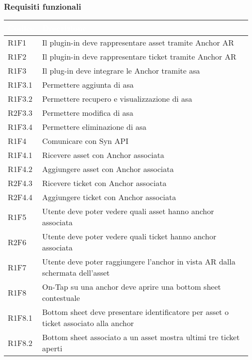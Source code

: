 \subsubsection{Requisiti funzionali}
{
    \setlength{\freewidth}{\dimexpr\textwidth-10\tabcolsep}
    \renewcommand{\arraystretch}{1.5}
    \centering
    \setlength{\aboverulesep}{0pt}
    \setlength{\belowrulesep}{0pt}
    \begin{longtable}{C{.15\freewidth} | C{1\freewidth}}
       \toprule
    \textcolor{white}{\textbf{Codice}}&
    \textcolor{white}{\textbf{Descrizione}}\\
    \toprule
    \endhead

    R1F1 & Il plugin-in deve rappresentare asset tramite Anchor AR\\
    R1F2 & Il plugin-in deve rappresentare ticket tramite Anchor AR\\
    R1F3 & Il plug-in deve integrare le Anchor tramite asa\\
    R1F3.1 & Permettere aggiunta di asa\\%
    R1F3.2 & Permettere recupero e visualizzazione di asa\\%
    R2F3.3 & Permettere modifica di asa\\%
    R1F3.4 & Permettere eliminazione di asa\\%
    R1F4 & Comunicare con Syn API\\
    R1F4.1 & Ricevere asset con Anchor associata\\
    R1F4.2 & Aggiungere asset con Anchor associata\\
    R2F4.3 & Ricevere ticket con Anchor associata\\
    R2F4.4 & Aggiungere ticket con Anchor associata\\
    R1F5 & Utente deve poter vedere quali asset hanno anchor associata\\
    R2F6 & Utente deve poter vedere quali ticket hanno anchor associata\\
    R1F7 & Utente deve poter raggiungere l'anchor in vista AR dalla schermata dell'asset\\
    R1F8 & On-Tap su una anchor deve aprire una bottom sheet contestuale\\
    R1F8.1 & Bottom sheet deve presentare identificatore per asset o ticket associato alla anchor\\
    R1F8.2 & Bottom sheet associato a un asset mostra ultimi tre ticket aperti\\

\end{longtable}}
